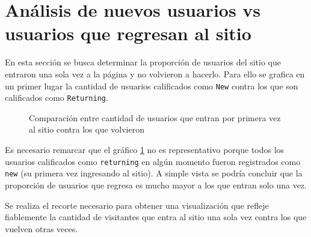 \documentclass[a4paper]{article}
\begin{document}
\section{Análisis de nuevos usuarios vs usuarios que regresan al sitio}

En esta sección se busca determinar la proporción de usuarios del sitio que entraron una sola vez a la página y no volvieron a hacerlo. Para ello se grafica en un primer lugar la cantidad de usuarios calificados como \texttt{New} contra los que son calificados como \texttt{Returning}.

\begin{figure}[h!]
	\caption{Comparación entre cantidad de usuarios que entran por primera vez al sitio contra los que volvieron}
	\label{fig:newvsreturningfalse}
\end{figure}

Es necesario remarcar que el gráfico \ref{fig:newvsreturningfalse} no es representativo porque todos los usuarios calificados como \texttt{returning} en algún momento fueron registrados como \texttt{new} (su primera vez ingresando al sitio). A simple vista se podría concluir que la proporción de usuarios que regresa es mucho mayor a los que entran solo una vez. 

Se realiza el recorte necesario para obtener una visualización que refleje fiablemente la cantidad de visitantes que entra al sitio una sola vez contra los que vuelven otras veces. 
\end{document}

